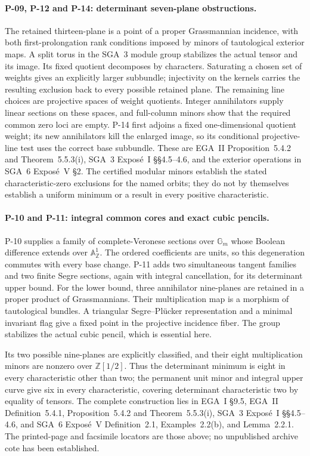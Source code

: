 \paragraph{P-09, P-12 and P-14: determinant seven-plane obstructions.}
The retained thirteen-plane is a point of a proper
Grassmannian incidence, with both first-prolongation
rank conditions imposed by minors of tautological
exterior maps. A split torus in the SGA~3 module group
stabilizes the actual tensor and its image. Its fixed
quotient decomposes by characters. Saturating a chosen
set of weights gives an explicitly larger subbundle;
injectivity on the kernels carries the resulting
exclusion back to every possible retained plane.
The remaining line choices are projective spaces of
weight quotients. Integer annihilators supply linear
sections on these spaces, and full-column minors show
that the required common zero loci are empty. P-14
first adjoins a fixed one-dimensional quotient weight;
its new annihilators kill the enlarged image, so its
conditional projective-line test uses the correct
base subbundle. These are EGA~II Proposition~5.4.2 and
Theorem~5.5.3(i), SGA~3 Expos\'e~I \S\S4.5--4.6, and
the exterior operations in SGA~6 Expos\'e~V \S2.
The certified modular minors establish the stated
characteristic-zero exclusions for the named orbits;
they do not by themselves establish a uniform minimum
or a result in every positive characteristic.

\paragraph{P-10 and P-11: integral common cores and exact cubic pencils.}
P-10 supplies a family of complete-Veronese sections
over $\mathbb G_m$ whose Boolean difference extends
over $\mathbb A^1_{\mathbb Z}$. The ordered coefficients
are units, so this degeneration commutes with every
base change. P-11 adds two simultaneous tangent families
and two finite Segre sections, again with integral
cancellation, for its determinant upper bound.
For the lower bound, three annihilator nine-planes
are retained in a proper product of Grassmannians.
Their multiplication map is a morphism of tautological
bundles. A triangular Segre--Pl\"ucker representation
and a minimal invariant flag give a fixed point in
the projective incidence fiber. The group stabilizes
the actual cubic pencil, which is essential here.

Its two possible nine-planes are explicitly classified,
and their eight multiplication minors are nonzero over
$\mathbb Z[1/2]$. Thus the determinant minimum is eight
in every characteristic other than two; the permanent
unit minor and integral upper curve give six in every
characteristic, covering determinant characteristic two
by equality of tensors. The complete construction lies
in EGA~I \S9.5, EGA~II Definition~5.4.1,
Proposition~5.4.2 and Theorem~5.5.3(i), SGA~3
Expos\'e~I \S\S4.5--4.6, and SGA~6 Expos\'e~V
Definition~2.1, Examples~2.2(b), and Lemma~2.2.1.
The printed-page and facsimile locators are those above;
no unpublished archive cote has been established.

